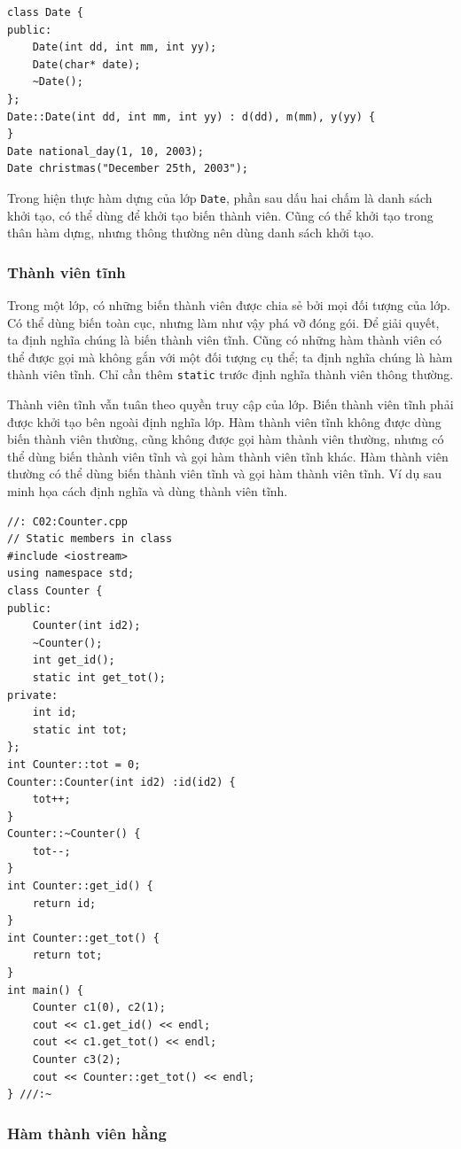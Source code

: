 \documentclass[11pt]{article}
\begin{document}
\begin{verbatim}
class Date {
public:
    Date(int dd, int mm, int yy);
    Date(char* date);
    ~Date();
};
Date::Date(int dd, int mm, int yy) : d(dd), m(mm), y(yy) {
}
Date national_day(1, 10, 2003);
Date christmas("December 25th, 2003");
\end{verbatim}

Trong hiện thực hàm dựng của lớp \verb|Date|, phần sau dấu hai chấm là danh
sách khởi tạo, có thể dùng để khởi tạo biến thành viên. Cũng có thể khởi tạo
trong thân hàm dựng, nhưng thông thường nên dùng danh sách khởi tạo.

\subsubsection*{Thành viên tĩnh}

Trong một lớp, có những biến thành viên được chia sẻ bởi mọi đối tượng của
lớp. Có thể dùng biến toàn cục, nhưng làm như vậy phá vỡ đóng gói. Để giải
quyết, ta định nghĩa chúng là biến thành viên tĩnh. Cũng có những hàm thành
viên có thể được gọi mà không gắn với một đối tượng cụ thể; ta định nghĩa
chúng là hàm thành viên tĩnh. Chỉ cần thêm \verb|static| trước định nghĩa
thành viên thông thường.

Thành viên tĩnh vẫn tuân theo quyền truy cập của lớp. Biến thành viên tĩnh
phải được khởi tạo bên ngoài định nghĩa lớp. Hàm thành viên tĩnh không được
dùng biến thành viên thường, cũng không được gọi hàm thành viên thường, nhưng
có thể dùng biến thành viên tĩnh và gọi hàm thành viên tĩnh khác. Hàm thành
viên thường có thể dùng biến thành viên tĩnh và gọi hàm thành viên tĩnh. Ví
dụ sau minh họa cách định nghĩa và dùng thành viên tĩnh.

\begin{verbatim}
//: C02:Counter.cpp
// Static members in class
#include <iostream>
using namespace std;
class Counter {
public:
    Counter(int id2);
    ~Counter();
    int get_id();
    static int get_tot();
private:
    int id;
    static int tot;
};
int Counter::tot = 0;
Counter::Counter(int id2) :id(id2) {
    tot++;
}
Counter::~Counter() {
    tot--;
}
int Counter::get_id() {
    return id;
}
int Counter::get_tot() {
    return tot;
}
int main() {
    Counter c1(0), c2(1);
    cout << c1.get_id() << endl;
    cout << c1.get_tot() << endl;
    Counter c3(2);
    cout << Counter::get_tot() << endl;
} ///:~
\end{verbatim}

\subsubsection*{Hàm thành viên hằng}
\end{document}
